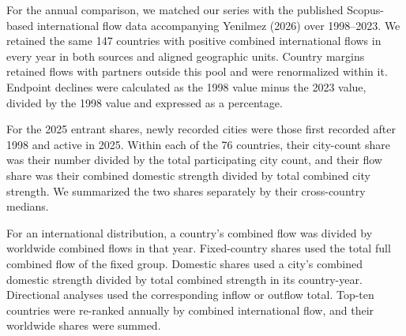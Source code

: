 For the annual comparison, we matched our series with the published Scopus-based international flow data accompanying Yenilmez (2026)\cite{yenilmez2026} over 1998--2023. We retained the same 147 countries with positive combined international flows in every year in both sources and aligned geographic units. Country margins retained flows with partners outside this pool and were renormalized within it. Endpoint declines were calculated as the 1998 value minus the 2023 value, divided by the 1998 value and expressed as a percentage.

For the 2025 entrant shares, newly recorded cities were those first recorded after 1998 and active in 2025. Within each of the 76 countries, their city-count share was their number divided by the total participating city count, and their flow share was their combined domestic strength divided by total combined city strength. We summarized the two shares separately by their cross-country medians.

For an international distribution, a country's combined flow was divided by worldwide combined flows in that year. Fixed-country shares used the total full combined flow of the fixed group. Domestic shares used a city's combined domestic strength divided by total combined strength in its country-year. Directional analyses used the corresponding inflow or outflow total. Top-ten countries were re-ranked annually by combined international flow, and their worldwide shares were summed.

